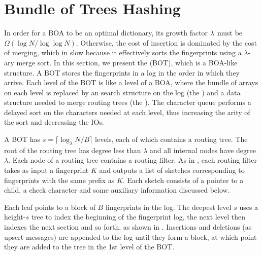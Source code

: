 \section{Bundle of Trees Hashing}\label{sec:boa-bot}

In order for a BOA to be an optimal dictionary, its growth factor $\lambda{}$
must be $\Omega(\log{N}/\log\log{N})$. Otherwise, the cost of insertion is
dominated by the cost of merging, which in slow because it effectively sorts
the fingerprints using a $\lambda$-ary merge sort. In this section, we present
the  (BOT), which is a BOA-like structure. A
BOT stores the fingerprints in a log in the order in which they arrive. Each
level of the BOT is like a level of a BOA, where the bundle of arrays on each
level is replaced by an search structure on the log (the )
and a data structure needed to merge routing trees (the ).  The character queue performs a delayed sort on the characters needed
at each level, thus increasing the arity of the sort and decreasing the IOs.

A BOT has $s = \lceil \log_\lambda N/B \rceil$ levels, each of which contains a
routing tree. The root of the routing tree has degree less than $\lambda$ and
all internal nodes have degree $\lambda$. Each node of a routing tree contains
a routing filter. As in , each routing filter takes as
input a fingerprint $K$ and outputs a list of sketches corresponding to
fingerprints with the same prefix as $K$. Each sketch consists of a pointer to
a child, a check character and some auxiliary information discussed below.

Each leaf points to a block of $B$ fingerprints in the log. The deepest level
$s$ uses a height-$s$ tree to index the beginning of the fingerprint log, the
next level then indexes the next section and so forth, as shown in
. Insertions and deletions (as upsert messages) are
appended to the log until they form a block, at which point they are added to
the tree in the 1st level of the BOT.

